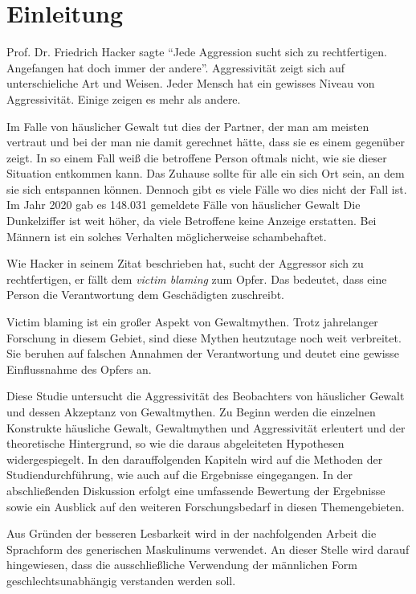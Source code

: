 \chapter{Einleitung}   \label{ch_1}
Prof. Dr. Friedrich Hacker sagte \enquote{Jede Aggression sucht sich zu rechtfertigen. 
Angefangen hat doch immer der andere}. \parencite{Friedrich_Hacker} 
Aggressivität zeigt sich auf unterschieliche Art und Weisen. Jeder Mensch hat 
ein gewisses Niveau von Aggressivität. Einige zeigen es mehr als andere. 


Im Falle von häuslicher Gewalt tut dies der Partner, der man am meisten vertraut und 
bei der man nie damit gerechnet hätte, dass sie es einem gegenüber zeigt. In so einem 
Fall weiß die betroffene Person oftmals nicht, wie sie dieser Situation entkommen kann. 
Das Zuhause sollte für alle ein sich Ort sein, an dem sie sich entspannen können. 
Dennoch gibt es viele Fälle wo dies nicht der Fall ist. Im Jahr 2020 gab es 148.031 
gemeldete Fälle von häuslicher Gewalt %
Die Dunkelziffer ist weit höher, da viele Betroffene keine Anzeige erstatten. Bei Männern
ist ein solches Verhalten möglicherweise schambehaftet.

Wie Hacker %
in seinem Zitat beschrieben hat, sucht der Aggressor sich zu rechtfertigen, er fällt
dem \textit{victim blaming} zum Opfer. Das bedeutet, dass eine Person die Verantwortung
dem Geschädigten zuschreibt. 

Victim blaming ist ein großer Aspekt von Gewaltmythen. Trotz jahrelanger Forschung in 
diesem Gebiet, sind diese Mythen heutzutage noch weit verbreitet. 
Sie beruhen auf falschen Annahmen der Verantwortung und deutet eine gewisse Einflussnahme 
des Opfers an.

Diese Studie untersucht die Aggressivität des Beobachters von häuslicher Gewalt und 
dessen Akzeptanz von Gewaltmythen. Zu Beginn werden die einzelnen Konstrukte häusliche 
Gewalt, Gewaltmythen und Aggressivität erleutert und der theoretische Hintergrund, so wie 
die daraus abgeleiteten Hypothesen widergespiegelt. In den darauffolgenden Kapiteln wird 
auf die Methoden der Studiendurchführung, wie auch auf die Ergebnisse eingegangen. In der 
abschließenden Diskussion erfolgt eine umfassende Bewertung der Ergebnisse sowie ein 
Ausblick auf den weiteren Forschungsbedarf in diesen Themengebieten.

Aus Gründen der besseren Lesbarkeit wird in der nachfolgenden Arbeit die Sprachform des
generischen Maskulinums verwendet. An dieser Stelle wird darauf hingewiesen, dass die 
ausschließliche Verwendung der männlichen Form geschlechtsunabhängig verstanden werden 
soll.